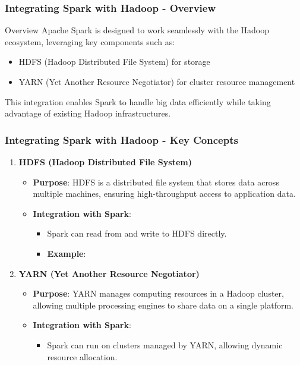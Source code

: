 \documentclass[aspectratio=169]{beamer}
\begin{document}
\begin{frame}[fragile]
    \frametitle{Integrating Spark with Hadoop - Overview}
    \begin{block}{Overview}
        Apache Spark is designed to work seamlessly with the Hadoop ecosystem, leveraging key components such as:
        \begin{itemize}
            \item HDFS (Hadoop Distributed File System) for storage
            \item YARN (Yet Another Resource Negotiator) for cluster resource management
        \end{itemize}
        This integration enables Spark to handle big data efficiently while taking advantage of existing Hadoop infrastructures.
    \end{block}
\end{frame}

\begin{frame}[fragile]
    \frametitle{Integrating Spark with Hadoop - Key Concepts}
    \begin{enumerate}
        \item \textbf{HDFS (Hadoop Distributed File System)}
            \begin{itemize}
                \item \textbf{Purpose}: HDFS is a distributed file system that stores data across multiple machines, ensuring high-throughput access to application data.
                \item \textbf{Integration with Spark}:
                \begin{itemize}
                    \item Spark can read from and write to HDFS directly.
                    \item \textbf{Example}:
                    \end{itemize}
            \end{itemize}
        \item \textbf{YARN (Yet Another Resource Negotiator)}
            \begin{itemize}
                \item \textbf{Purpose}: YARN manages computing resources in a Hadoop cluster, allowing multiple processing engines to share data on a single platform.
                \item \textbf{Integration with Spark}:
                \begin{itemize}
                    \item Spark can run on clusters managed by YARN, allowing dynamic resource allocation.
                \end{itemize}
            \end{itemize}
    \end{enumerate}
\end{frame}
\end{document}
